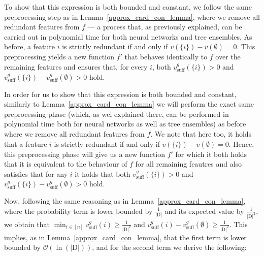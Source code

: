 \documentclass{article}
\begin{document}



To show that this expression is both bounded and constant, we follow the same preprocessing step as in Lemma~\ref{approx_card_con_lemma}, where we remove all redundant features from $f$ --- a process that, as previously explained, can be carried out in polynomial time for both neural networks and tree ensembles. As before, a feature $i$ is strictly redundant if and only if $v(\{i\}) - v(\emptyset) = 0$. This preprocessing yields a new function $f'$ that behaves identically to $f$ over the remaining features and ensures that, for every $i$, both $v^g_{\text{suff}}(\{i\})>0$ and $v^g_{\text{suff}}(\{i\}) - v^g_{\text{suff}}(\emptyset)>0$ hold.


In order for us to show that this expression is both bounded and constant, similarly to Lemma~\ref{approx_card_con_lemma} we will perform the exact same preprocessing phase (which, as wel explained there, can be performed in polynomial time both for neural networks as well as tree ensembles) as before where we remove all redundant features from $f$. We note that here too, it holds that a feature $i$ is strictly redundant if and only if $v(\{i\})-v(\emptyset)=0$. Hence, this preprocessing phase will give us a new function $f'$ for which it both holds that it is equivalent to the behaviour of $f$ for all remaining feautres and also satisfies that for any $i$ it holds that both $v^g_{\text{suff}}(\{i\})>0$ and $v^g_{\text{suff}}(\{i\}) - v^g_{\text{suff}}(\emptyset)>0$ hold. 


Now, following the same reasoning as in Lemma~\ref{approx_card_con_lemma}, where the probability term is lower bounded by $\frac{1}{|\text{D}|}$ and its expected value by $\frac{1}{|\text{D}|^2}$, we obtain that $\min_{i \in [n]} v^g_{\text{suff}}({i}) \geq \frac{1}{|\text{D}|^2}$ and $v^g_{\text{suff}}({i}) - v^g_{\text{suff}}(\emptyset) \geq \frac{1}{|\text{D}|^2}$. This implies, as in Lemma~\ref{approx_card_con_lemma}, that the first term is lower bounded by $\mathcal{O}(\ln(|\text{D}|))$, and for the second term we derive the following:
\end{document}
